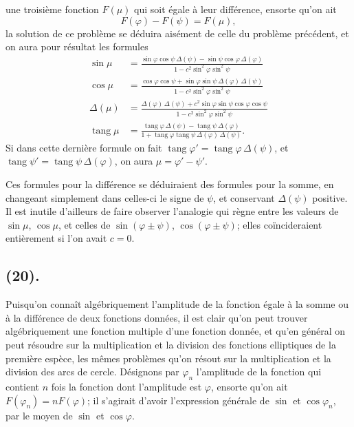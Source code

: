 \documentclass{article}
\begin{document}
une troisième fonction $F(\mu)$ qui soit égale à leur différence, ensorte qu'on ait
\[ F(\varphi)-F(\psi)=F(\mu), \]
la solution de ce problème se déduira aisément de celle du problème précédent, et on aura pour résultat les formules
\[ \begin{aligned} \sin\mu &= \frac{\sin\varphi\cos\psi\,\Delta(\psi)-\sin\psi\cos\varphi\,\Delta(\varphi)}{1-c^{2}\sin^{2}\varphi\sin^{2}\psi} \\ \cos\mu &= \frac{\cos\varphi\cos\psi+\sin\varphi\sin\psi\,\Delta(\varphi)\,\Delta(\psi)}{1-c^{2}\sin^{2}\varphi\sin^{2}\psi} \\ \Delta(\mu) &= \frac{\Delta(\varphi)\,\Delta(\psi)+c^{2}\sin\varphi\sin\psi\cos\varphi\cos\psi}{1-c^{2}\sin^{2}\varphi\sin^{2}\psi} \\ \operatorname{tang}\mu &= \frac{\operatorname{tang}\varphi\,\Delta(\psi)-\operatorname{tang}\psi\,\Delta(\varphi)}{1+\operatorname{tang}\varphi\operatorname{tang}\psi\,\Delta(\varphi)\,\Delta(\psi)}. \end{aligned} \]
Si dans cette dernière formule on fait $\operatorname{tang}\varphi'=\operatorname{tang}\varphi\,\Delta(\psi)$, et $\operatorname{tang}\psi'=\operatorname{tang}\psi\,\Delta(\varphi)$, on aura $\mu=\varphi'-\psi'$.

Ces formules pour la différence se déduiraient des formules pour la somme, en changeant simplement dans celles-ci le signe de $\psi$, et conservant $\Delta(\psi)$ positive. Il est inutile d'ailleurs de faire observer l'analogie qui règne entre les valeurs de $\sin\mu$, $\cos\mu$, et celles de $\sin(\varphi\pm\psi)$, $\cos(\varphi\pm\psi)$; elles coïncideraient entièrement si l'on avait $c=0$.

\subsection*{(20).}

Puisqu'on connaît algébriquement l'amplitude de la fonction égale à la somme ou à la différence de deux fonctions données, il est clair qu'on peut trouver algébriquement une fonction multiple d'une fonction donnée, et qu'en général on peut résoudre sur la multiplication et la division des fonctions elliptiques de la première espèce, les mêmes problèmes qu'on résout sur la multiplication et la division des arcs de cercle. Désignons par $\varphi_{n}$ l'amplitude de la fonction qui contient $n$ fois la fonction dont l'amplitude est $\varphi$, ensorte qu'on ait $F(\varphi_{n})=nF(\varphi)$; il s'agirait d'avoir l'expression générale de $\sin$ et $\cos\varphi_{n}$, par le moyen de $\sin$ et $\cos\varphi$.
\end{document}
